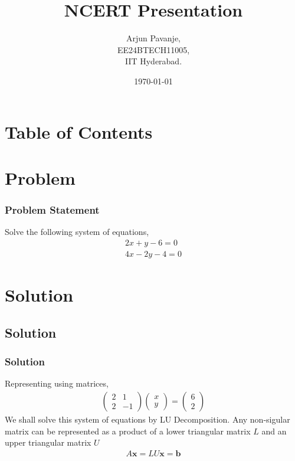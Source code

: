 \documentclass{beamer}
\title{NCERT Presentation}
\author{Arjun Pavanje,\\ EE24BTECH11005,\\IIT Hyderabad.\\}
\date{\today}
\theoremstyle{remark}
\newcommand{\myvec}[1]{\ensuremath{\begin{pmatrix}#1\end{pmatrix}}}
\let\vec\mathbf
\numberwithin{equation}{section}
\begin{document}
    \begin{frame}
      \titlepage
    \end{frame}

    \section*{Table of Contents}
    \begin{frame}
      \tableofcontents
    \end{frame}
    \section{Problem}
    \begin{frame}
      \frametitle{Problem Statement}
      Solve the following system of equations,
      \begin{align}
        2x + y - 6 = 0\\
        4x - 2y - 4 = 0
      \end{align}
    \end{frame}
    \section{Solution}
    \subsection{Solution}
    \begin{frame}
      \frametitle{Solution}
      Representing using matrices,
      \begin{align}
        \myvec{
          2 & 1\\
          2 & -1
        } \myvec{x \\ y}= \myvec{ 6 \\ 2}
      \end{align}
      We shall solve this system of equations by LU Decomposition. Any non-sigular matrix can be represented as a product of a lower triangular matrix $L$ and an upper triangular matrix $U$
      \begin{align}
        A\vec{x} = LU\vec{x} = \vec{b}
      \end{align}
    \end{frame}
\end{document}
